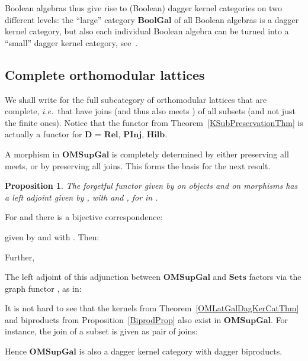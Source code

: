 \documentclass{article}
\newif\ifignore \ignorefalse
\newcommand{\auxproof}[1]{
\ifignore\mbox{}\newline
\textbf{PROOF:} \dotfill\newline
{\it #1}\mbox{}\newline
\textbf{ENDPROOF}\dotfill
\fi}
\newtheorem{proposition}[theorem]{Proposition}
\newenvironment{proof}[1][Proof]{ \begin{trivlist}\item[\hskip \labelsep {\bfseries #1}]}{ \end{trivlist}}
\newcommand{\cat}[1]{\ensuremath{\mathbf{#1}}}
\newcommand{\Cat}[1]{\ensuremath{\mathbf{#1}}}
\newcommand{\Rel}{\Cat{Rel}\xspace}
\newcommand{\PInj}{\Cat{PInj}\xspace}
\newcommand{\Hilb}{\Cat{Hilb}\xspace}
\newcommand{\Sets}{\Cat{Sets}\xspace}
\begin{document}
Boolean algebras thus give rise to (Boolean) dagger kernel categories
on two different levels: the ``large'' category \Cat{BoolGal} of all
Boolean algebras is a dagger kernel category, but also each individual
Boolean algebra can be turned into a ``small'' dagger kernel category,
see~\cite[Proposition~3.5]{HeunenJ09a}.



\subsection{Complete orthomodular lattices}\label{CompleteSubsec}

We shall write  for the
full subcategory of orthomodular lattices that are complete,
\textit{i.e.}~that have joins  (and thus also meets
) of all subsets  (and not just the finite ones).
Notice that the functor  from Theorem~\ref{KSubPreservationThm} is actually a
functor  for \Cat{D} =
\Rel, \PInj, \Hilb.

A morphism  in \Cat{OMSupGal} is completely
determined by either  preserving all
meets, or by  preserving all
joins. This forms the basis for the next result.


\begin{proposition}
\label{FreeOMLatGalProp}
The forgetful functor  given by
 on objects and  on morphisms
has a left adjoint  given by , with
 and , for  in .
\end{proposition}


\begin{proof}
For  and  there is a bijective
correspondence:


\noindent given by  and
 with
. Then:


\noindent Further,


\auxproof{
We check naturality:

}
\end{proof}



The left adjoint  of this adjunction between \cat{OMSupGal} and
\Sets factors via the graph functor , as in:


It is not hard to see that the kernels from
Theorem~\ref{OMLatGalDagKerCatThm} and biproducts  from
Proposition~\ref{BiprodProp} also exist in \Cat{OMSupGal}.  For
instance, the join of a subset  is given as pair
of joins:


\noindent Hence \Cat{OMSupGal} is also a dagger kernel category
with dagger biproducts.
\end{document}
